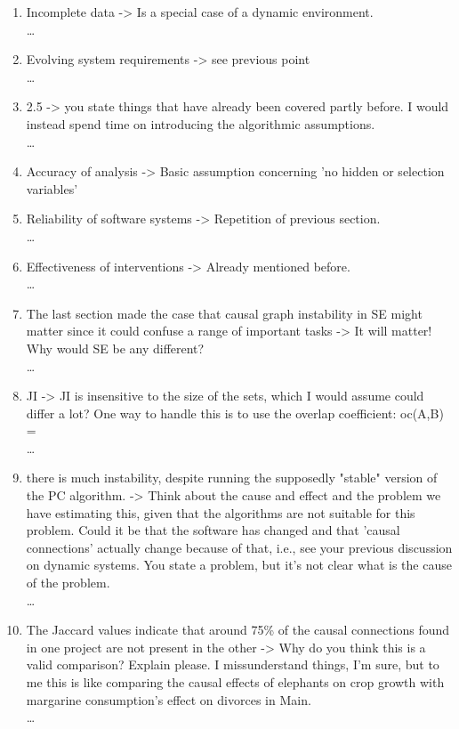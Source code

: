 \documentclass[]{svjour3}
\begin{document}
\begin{enumerate}
\begin{enumerate}
    \item Incomplete data -> Is a special case of a dynamic environment.\\{\MARK \dots}
    \item Evolving system requirements -> see previous point\\{\MARK \dots}
    \item 2.5 -> you state things that have already been covered partly before. I would instead spend time on introducing the algorithmic assumptions.\\{\MARK \dots}
    \item  Accuracy of analysis -> Basic assumption concerning 'no hidden or selection variables'
    \item Reliability of software systems -> Repetition of previous section.\\{\MARK \dots}
    \item  Effectiveness of interventions -> Already mentioned before.\\{\MARK \dots}
    \item The last section made the case that causal graph instability in SE might matter since it could confuse a range of important tasks -> It will matter! Why would SE be any different?\\{\MARK \dots}
    \item JI -> JI is insensitive to the size of the sets, which I would assume could differ a lot? One way to handle this is to use the overlap coefficient: oc(A,B) = \\{\MARK \dots}
    \item  there is much instability, despite running the supposedly "stable" version of the PC algorithm. -> Think about the cause and effect and the problem we have estimating this, given that the algorithms are not suitable for this problem. Could it be that the software has changed and that 'causal connections' actually change because of that, i.e., see your previous discussion on dynamic systems. You state a problem, but it's not clear what is the cause of the problem.\\{\MARK \dots}
    \item  The Jaccard values indicate that around 75\% of the causal connections found in one project are not present in the other -> Why do you think this is a valid comparison? Explain please. I missunderstand things, I'm sure, but to me this is like comparing the causal effects of elephants on crop growth with margarine consumption's effect on divorces in Main.\\{\MARK \dots}

\end{enumerate}
\end{enumerate}
\end{document}

